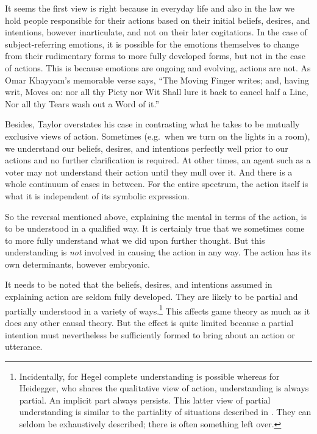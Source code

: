It seems the first view is right because in everyday life and also in the law we hold people responsible for their actions based on their initial beliefs, desires, and intentions, however inarticulate, and not on their later cogitations. In the case of subject-referring emotions, it is possible for the emotions themselves to change from their rudimentary forms to more fully developed forms, but not in the case of actions. This is because emotions are ongoing and evolving, actions are not. As  Omar Khayyam's memorable verse says, ``The Moving Finger writes; and, having writ, Moves on: nor all thy Piety nor Wit Shall lure it back to cancel half a Line, Nor all thy Tears wash out a Word of it.''

Besides, Taylor overstates his case in contrasting what he takes to be mutually exclusive views of action. Sometimes (e.g.\ when we turn on the lights in a room), we understand our beliefs, desires, and intentions perfectly well prior to our actions and no further clarification is required. At other times, an agent such as a voter may not understand their action until they mull over it. And there is a whole continuum of cases in between. For the entire spectrum, the action itself is what it is independent of its symbolic expression.

So the reversal mentioned above, explaining the mental in terms of the action, is to be understood in a qualified way. It is certainly true that we sometimes come to more fully understand what we did upon further thought. But this understanding is \emph{not} involved in causing the action in any way. The action has its own determinants, however embryonic. 


It needs to be noted that the beliefs, desires, and intentions assumed in explaining action are seldom fully developed. They are likely to be partial and partially understood in a variety of ways.\footnote{Incidentally, for Hegel complete understanding is possible whereas for Heidegger, who shares the qualitative view of action, understanding is always partial. An implicit part always persists. This latter view of partial understanding is similar to the partiality of situations described in . They can seldom be exhaustively described; there is often something left over.} This affects game theory as much as it does any other causal theory. But the effect is quite limited because a partial intention must nevertheless be sufficiently formed to bring about an action or utterance.


